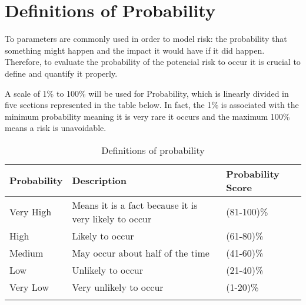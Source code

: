 \section{Definitions of Probability}

To parameters are commonly used in order to model risk: the probability that something might happen and the impact it would have if it did happen. Therefore, to evaluate the probability of the potencial risk to occur it is crucial to define and quantify it properly. 

A scale of 1\% to 100\% will be used for Probability, which is linearly divided in five sections represented in the table below. In fact, the 1\% is associated with the minimum probability meaning it is very rare it occurs and the maximum 100\% means a risk is unavoidable. 

\begin{longtable}[H]{l >{\raggedright\arraybackslash}p{7.8cm} p{4cm}}
	
	\toprule[2pt]
	
	\textbf{Probability} &  \textbf{Description}  & \textbf{Probability Score} \\
	
	\midrule [1.5pt]
	\endhead
	
	Very High & Means it is a fact because it is very likely to occur & (81-100)\%
	\vspace{0.2cm} \\
	
	\midrule
	
	High & Likely to occur & (61-80)\%
	\vspace{0.2cm} \\
	
	\midrule
	
	Medium & May occur about half of the time & (41-60)\% 
	\vspace{0.2cm} \\

	\midrule

	Low & Unlikely to occur & (21-40)\% 
	\vspace{0.2cm} \\

	\midrule

	Very Low & Very unlikely to occur & (1-20)\% 
	\vspace{0.2cm} \\
		
	\bottomrule[2pt]
	
	\caption{Definitions of probability}

\end{longtable}